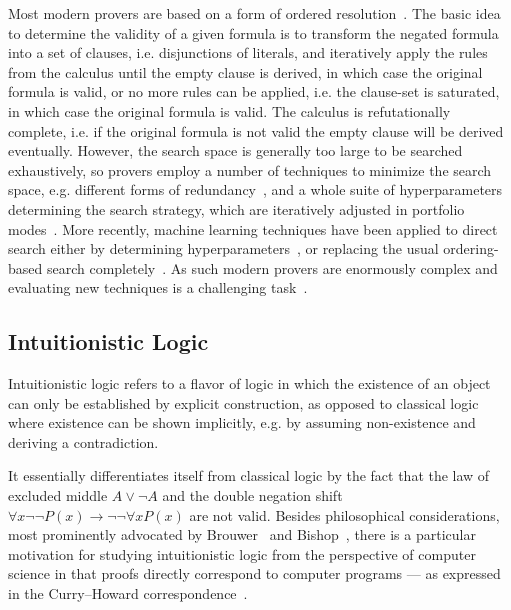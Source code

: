 \documentclass{article}
\theoremstyle{definition}
\theoremstyle{definition}
\theoremstyle{definition}
\theoremstyle{definition}
\theoremstyle{definition}
\theoremstyle{definition}
\theoremstyle{definition}
\newcommand{\0}{\mathbf 0}
\newcommand{\1}{\mathbf 1}
\begin{document}
	Most modern provers are based on a form of ordered resolution~\cite{bachmair2001resolution}. The basic idea to determine the validity of a given formula is to transform the negated formula into a set of clauses, i.e. disjunctions of literals, and iteratively apply the rules from the calculus until the empty clause is derived, in which case the original formula is valid, or no more rules can be applied, i.e. the clause-set is saturated, in which case the original formula is valid. The calculus is refutationally complete, i.e. if the original formula is not valid the empty clause will be derived eventually. However, the search space is generally too large to be searched exhaustively, so provers employ a number of techniques to minimize the search space, e.g. different forms of redundancy~\cite{bachmair1994rewrite, hillenbrand2013search, gleiss2020subsumption}, and a whole suite of hyperparameters determining the search strategy, which are iteratively adjusted in portfolio modes~\cite{rawson2018dynamic}. More recently, machine learning techniques have been applied to direct search either by determining hyperparameters~\cite{bartek2020learning,bartek2023much}, or replacing the usual ordering-based search completely~\cite{jakubuuv2017enigma,kaliszyk2018reinforcement,crouse2021deep}. As such modern provers are enormously complex and evaluating new techniques is a challenging task~\cite{reger2014challenges}.


	\subsection{Intuitionistic Logic}

	Intuitionistic logic refers to a flavor of logic in which the existence of an object can only be established by explicit construction, as opposed to classical logic where existence can be shown implicitly, e.g. by assuming non-existence and deriving a contradiction.

	It essentially differentiates itself from classical logic by the fact that the law of excluded middle $A\vee\neg A$ and the double negation shift $\forall x\neg\neg P(x)\to\neg\neg\forall xP(x)$ are not valid.
	Besides philosophical considerations, most prominently advocated by Brouwer~\cite{brouwer1907over} and Bishop~\cite{bishop1967foundations}, there is a particular motivation for studying intuitionistic logic from the perspective of computer science in that proofs directly correspond to computer programs --- as expressed in the Curry--Howard correspondence~\cite{howard1980formulae}.
	
\end{document}
